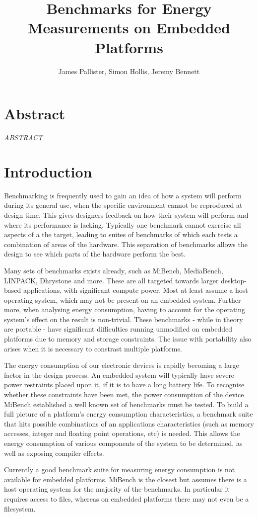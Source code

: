 \documentclass[twocolumn]{article}
\title{\bfseries\fontsize{22}{1}\selectfont Benchmarks for Energy Measurements on Embedded Platforms}
\author{James Pallister, Simon Hollis, Jeremy Bennett}
\newcommand{\nsection}[1]{\section{\bfseries #1}}
\begin{document}
\maketitle
\nsection{Abstract}

\textit{ABSTRACT}

\nsection{Introduction}

Benchmarking is frequently used to gain an idea of how a system will perform during its general use, when the specific environment cannot be reproduced at design-time. This gives designers feedback on how their system will perform and where its performance is lacking. Typically one benchmark cannot exercise all aspects of a the target, leading to suites of benchmarks of which each tests a combination of areas of the hardware. This separation of benchmarks allows the design to see which parts of the hardware perform the best.


Many sets of benchmarks exists already, such as MiBench\cite{MiBench}, MediaBench\cite{MediaBench}, LINPACK\cite{LINPACK}, Dhrystone\cite{Dhrystone} and more. These are all targeted towards larger desktop-based applications, with significant compute power. Most at least assume a host operating system, which may not be present on an embedded system. Further more, when analysing energy consumption, having to account for the operating system’s effect on the result is non-trivial. These benchmarks - while in theory are portable - have significant difficulties running unmodified on embedded platforms due to memory and storage constraints. The issue with portability also arises when it is necessary to constrast multiple platforms.

The energy consumption of our electronic devices is rapidly becoming a large factor in the design process. An embedded system will typically have severe power restraints placed upon it, if it is to have a long battery life. To recognise whether these constraints have been met, the power consumption of the device MiBench established a well known set of benchmarks must be tested. To build a full picture of a platform’s energy consumption characteristics, a benchmark suite that hits possible combinations of an applications characteristics (such as memory accesses, integer and floating point operations, etc) is needed. This allows the energy consumption of various components of the system to be determined, as well as exposing compiler effects.

Currently a good benchmark suite for measuring energy consumption is not available for embedded platforms. MiBench is the closest but assumes there is a host operating system for the majority of the benchmarks. In particular it requires access to files, whereas on embedded platforms there may not even be a filesystem.
\end{document}
